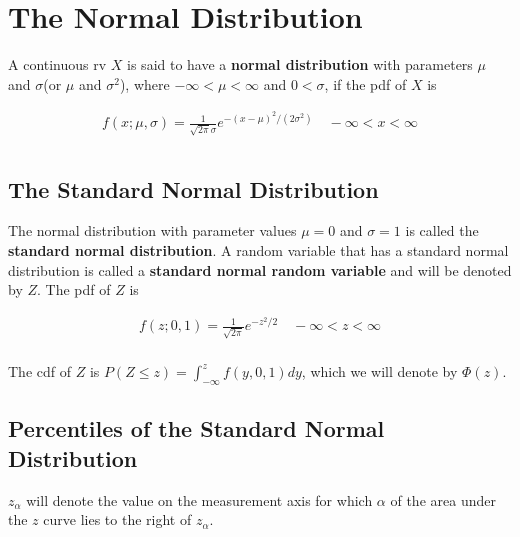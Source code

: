 \section{The Normal Distribution}

\begin{definition}
    A continuous rv $X$ is said to have a \textbf{normal distribution} with parameters $\mu$ and $\sigma$(or $\mu$ and $\sigma^2$), where $-\infty < \mu < \infty$ and $0 < \sigma$, if the pdf of $X$ is 

    \begin{align*}
        f(x;\mu,\sigma) = \frac{1}{\sqrt{2\pi}\sigma} e^{-(x-\mu)^2/(2\sigma^2)} \quad -\infty<x<\infty \\
    \end{align*}
\end{definition}

\subsection{The Standard Normal Distribution}

\begin{definition}
    The normal distribution with parameter values $\mu = 0$ and $\sigma = 1$ is called the \textbf{standard normal distribution}. A random variable that has a standard normal distribution is called a \textbf{standard normal random variable} and will be denoted by $Z$. The pdf of $Z$ is 

    \begin{align*}
        f(z;0,1) = \frac{1}{\sqrt{2\pi}}e^{-z^2/2}\quad -\infty<z<\infty \\
    \end{align*}

    The cdf of $Z$ is $P(Z\leq z) = \int_{-\infty}^z f(y,0,1) dy$, which we will denote by $\Phi(z)$.
\end{definition}

\subsection{Percentiles of the Standard Normal Distribution}

\begin{notation}
    $z_\alpha$ will denote the value on the measurement axis for which $\alpha$ of the area under the $z$ curve lies to the right of $z_\alpha$.
\end{notation}

